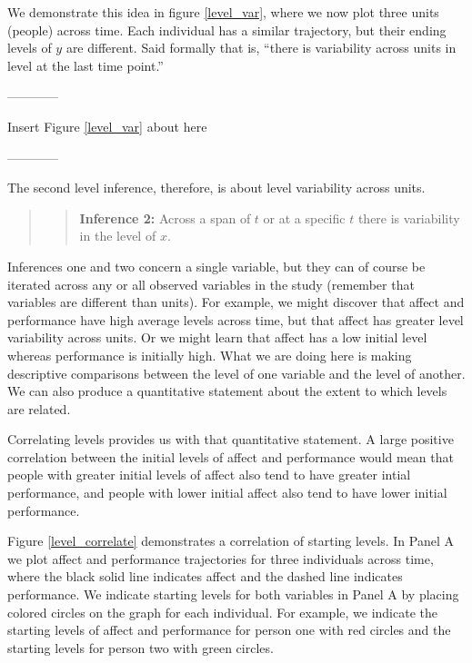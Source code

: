 \documentclass[english,,man]{apa6}
\theoremstyle{definition}
\theoremstyle{definition}
\theoremstyle{definition}
\theoremstyle{remark}
\begin{document}
We demonstrate this idea in figure \ref{level_var}, where we now plot
three units (people) across time. Each individual has a similar
trajectory, but their ending levels of \(y\) are different. Said
formally that is, \enquote{there is variability across units in level at
the last time point.}

\begin{center}

------------

Insert Figure \ref{level_var} about here

------------

\end{center}

\noindent The second level inference, therefore, is about level
variability across units.

\begin{quote}
\begin{quote}
\textbf{Inference 2:} Across a span of \(t\) or at a specific \(t\)
there is variability in the level of \(x\).
\end{quote}
\end{quote}

Inferences one and two concern a single variable, but they can of course
be iterated across any or all observed variables in the study (remember
that variables are different than units). For example, we might discover
that affect and performance have high average levels across time, but
that affect has greater level variability across units. Or we might
learn that affect has a low initial level whereas performance is
initially high. What we are doing here is making descriptive comparisons
between the level of one variable and the level of another. We can also
produce a quantitative statement about the extent to which levels are
related.

Correlating levels provides us with that quantitative statement. A large
positive correlation between the initial levels of affect and
performance would mean that people with greater initial levels of affect
also tend to have greater intial performance, and people with lower
initial affect also tend to have lower initial performance.

Figure \ref{level_correlate} demonstrates a correlation of starting
levels. In Panel A we plot affect and performance trajectories for three
individuals across time, where the black solid line indicates affect and
the dashed line indicates performance. We indicate starting levels for
both variables in Panel A by placing colored circles on the graph for
each individual. For example, we indicate the starting levels of affect
and performance for person one with red circles and the starting levels
for person two with green circles.
\end{document}
